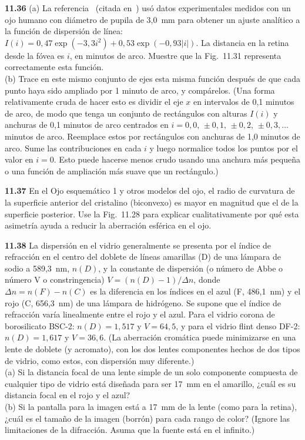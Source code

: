 \documentclass[12pt]{book}
\begin{document}
\textbf{11.36} (a) La referencia~\cite{64} (citada en~\cite{63}) usó datos experimentales medidos con un ojo humano con diámetro de pupila de 3,0~mm para obtener un ajuste analítico a la función de dispersión de línea: $I(i) = 0{,}47\exp(-3{,}3i^2) + 0{,}53\exp(-0{,}93|i|)$. La distancia en la retina desde la fóvea es $i$, en minutos de arco. Muestre que la Fig.~11.31 representa correctamente esta función.\\
(b) Trace en este mismo conjunto de ejes esta misma función después de que cada punto haya sido ampliado por 1 minuto de arco, y compárelos. (Una forma relativamente cruda de hacer esto es dividir el eje $x$ en intervalos de 0,1 minutos de arco, de modo que tenga un conjunto de rectángulos con alturas $I(i)$ y anchuras de 0,1 minutos de arco centrados en $i = 0{,}0,\, \pm 0{,}1,\, \pm 0{,}2,\, \pm 0{,}3,\ldots$ minutos de arco. Reemplace estos por rectángulos con anchuras de 1,0 minutos de arco. Sume las contribuciones en cada $i$ y luego normalice todos los puntos por el valor en $i = 0$. Esto puede hacerse menos crudo usando una anchura más pequeña o una función de ampliación más suave que un rectángulo.)

\textbf{11.37} En el Ojo esquemático 1 y otros modelos del ojo, el radio de curvatura de la superficie anterior del cristalino (biconvexo) es mayor en magnitud que el de la superficie posterior. Use la Fig.~11.28 para explicar cualitativamente por qué esta asimetría ayuda a reducir la aberración esférica en el ojo.

\textbf{11.38} La dispersión en el vidrio generalmente se presenta por el índice de refracción en el centro del doblete de líneas amarillas (D) de una lámpara de sodio a 589,3~nm, $n(D)$, y la constante de dispersión (o número de Abbe o número V o constringencia) $V = (n(D)-1)/\Delta n$, donde $\Delta n = n(F) - n(C)$ es la diferencia en los índices en el azul (F, 486,1~nm) y el rojo (C, 656,3~nm) de una lámpara de hidrógeno. Se supone que el índice de refracción varía linealmente entre el rojo y el azul. Para el vidrio corona de borosilicato BSC-2: $n(D) = 1{,}517$ y $V = 64{,}5$, y para el vidrio flint denso DF-2: $n(D) = 1{,}617$ y $V = 36{,}6$. (La aberración cromática puede minimizarse en una lente de doblete (y acromato), con los dos lentes componentes hechos de dos tipos de vidrio, como estos, con dispersión muy diferente.)\\
(a) Si la distancia focal de una lente simple de un solo componente compuesta de cualquier tipo de vidrio está diseñada para ser 17~mm en el amarillo, ¿cuál es su distancia focal en el rojo y el azul?\\
(b) Si la pantalla para la imagen está a 17~mm de la lente (como para la retina), ¿cuál es el tamaño de la imagen (borrón) para cada rango de color? (Ignore las limitaciones de la difracción. Asuma que la fuente está en el infinito.)
\end{document}

